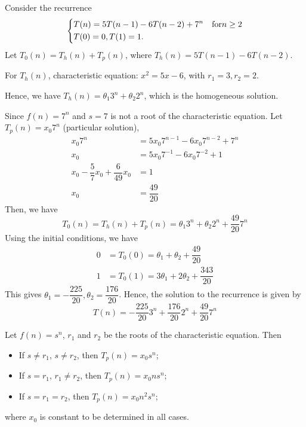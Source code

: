 \begin{eg}
    Consider the recurrence
    \[
        \begin{dcases}
            T(n) = 5T(n - 1) - 6T(n - 2) + 7^n\quad\text{for} n \geq 2\\
            T(0) = 0, T(1) = 1.
        \end{dcases}
    \]
    Let \(T_0(n) = T_h(n) + T_p(n)\), where \(T_h(n) = 5T(n - 1) - 6T(n - 2)\). 
    
    For \(T_h(n)\), characteristic equation: \(x^2 = 5x - 6\), with \(r_1 = 3, r_2 = 2\). 
    
    Hence, we have \(T_h(n) = \theta_1 3^n + \theta_2 2^n\), which is the homogeneous solution. 

    Since \(f(n) = 7^n\) and \(s = 7\) is not a root of the characteristic equation. Let \(T_p(n) = x_0 7^n\) (particular solution),
    \[
        \begin{aligned}
            x_0 7^n &= 5x_0 7^{n-1}  - 6x_0 7^{n-2} + 7^n \\
            x_0 &= 5x_0 7^{-1}  - 6x_0 7^{-2} + 1 \\
            x_0 - \dfrac{5}{7}x_0 + \dfrac{6}{49}x_0 &= 1 \\
            x_0 &= \dfrac{49}{20}
        \end{aligned}
    \]
    Then, we have
    \[
        T_0(n) = T_h(n) + T_p(n) = \theta_1 3^n + \theta_2 2^n + \dfrac{49}{20} 7^n
    \]
    Using the initial conditions, we have
    \[
        \begin{aligned}
            0 &= T_0(0) = \theta_1 + \theta_2 + \dfrac{49}{20} \\
            1 &= T_0(1) = 3\theta_1 + 2\theta_2 + \dfrac{343}{20}
        \end{aligned}
    \]
    This gives \(\theta_1 = -\dfrac{225}{20}, \theta_2 = \dfrac{176}{20}\). Hence, the solution to the recurrence is given by
    \[
        T(n) = -\dfrac{225}{20} 3^n + \dfrac{176}{20} 2^n + \dfrac{49}{20} 7^n
    \]
\end{eg}



\begin{remark}
    Let \(f(n) = s^n\), \(r_1\) and \(r_2\) be the roots of the characteristic equation. Then
    \begin{itemize}
        \item If \(s \neq r_1\), \(s \neq r_2\), then \(T_p(n) = x_0 s^n\);
        \item If \(s = r_1\), \(r_1 \neq r_2\), then \(T_p(n) = x_0 ns^n\);
        \item If \(s = r_1 = r_2\), then \(T_p(n) = x_0 n^2 s^n\);
    \end{itemize}
    where \(x_0\) is constant to be determined in all cases. 
\end{remark}

